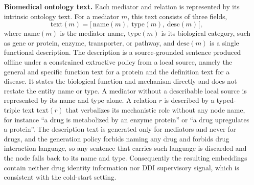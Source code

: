 \documentclass[letterpaper]{article} %
\begin{document}
\textbf{Biomedical ontology text.} Each mediator and relation is represented by its intrinsic ontology text. For a mediator $m$, this text consists of three fields,
\begin{equation}
\mathrm{text}(m) = \big[\,\mathrm{name}(m),\ \mathrm{type}(m),\ \mathrm{desc}(m)\,\big],
\end{equation}
where $\mathrm{name}(m)$ is the mediator name, $\mathrm{type}(m)$ is its biological category, such as gene or protein, enzyme, transporter, or pathway, and $\mathrm{desc}(m)$ is a single functional description. The description is a source-grounded sentence produced offline under a constrained extractive policy from a local source, namely the general and specific function text for a protein and the definition text for a disease. It states the biological function and mechanism directly and does not restate the entity name or type. A mediator without a describable local source is represented by its name and type alone. A relation $r$ is described by a typed-triple text $\mathrm{text}(r)$ that verbalizes its mechanistic role without any node name, for instance ``a drug is metabolized by an enzyme protein'' or ``a drug upregulates a protein''. The description text is generated only for mediators and never for drugs, and the generation policy forbids naming any drug and forbids drug interaction language, so any sentence that carries such language is discarded and the node falls back to its name and type. Consequently the resulting embeddings contain neither drug identity information nor DDI supervisory signal, which is consistent with the cold-start setting.
\end{document}
